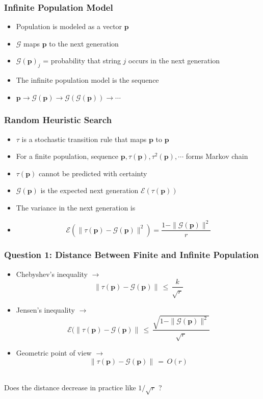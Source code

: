 \documentclass[aspectratio=169]{beamer}
\begin{document}
  \begin{frame}
    \frametitle{Infinite Population Model}
    \begin{itemize}
      \item{Population is modeled as a vector $\bm{p}$}
      \item{$\mathcal{G}$ maps $\bm{p}$ to the next generation}
      \item{$\mathcal{G}(\bm{p})_j$ =  probability that string $j$ occurs in the next generation}
      \item{The infinite population model is the sequence }
      \item{$\bm{p} \to \mathcal{G}(\bm{p}) \to  {\mathcal{G}}(\mathcal{G}(\bm{p})) \to \cdots $}
    \end{itemize}  
  \end{frame}
  
  \begin{frame}
    \frametitle{Random Heuristic Search}
    \begin{itemize}
      \item{$\tau$ is a stochastic transition rule that maps $\bm{p}$ to $\bm{p}$}
      \item{For a finite population, sequence $\bm{p}, \tau(\bm{p}), \tau^2(\bm{p}), \cdots $ forms Markov chain}
      \item{$\tau(\bm{p})$ cannot be predicted with certainty }
      \item{$\mathcal{G}(\bm{p})$ is the expected next generation $\mathcal{E}(\tau(\bm{p}))$}
      \item{The variance in the next generation  is}
      \item{
	\[\mathcal{E}(\| \tau (\bm{p}) - \mathcal{G}(\bm{p}) \|^2) = \frac{1 - \|\mathcal{G}(\bm{p})\|^2}{r}\]
      }
    \end{itemize}
  \end{frame}
  
  \begin{frame}
    \frametitle{Question 1: Distance Between Finite and Infinite Population}
    \begin{itemize}
      \item{Chebyshev's inequality $\to$ \[ \| \tau (\bm{p}) - \mathcal{G}(\bm{p}) \| \,\leq\, \frac{k}{\sqrt{r}} \] }
      \item{Jensen's inequality  
      $\to$ \[ \mathcal{E}(\| \tau (\bm{p}) - \mathcal{G}(\bm{p}) \| \,\leq\, \frac{\sqrt{1 - \|\mathcal{G}(\bm{p})\|^2}}{\sqrt{r}}\]}
      \item{Geometric point of view $\to$ \[ \| \tau (\bm{p}) - \mathcal{G}(\bm{p}) \| \,=\, O(r) \] }      
    \end{itemize}
      \mbox{}\\[0.25 in]
    Does the distance decrease in practice like $1/\sqrt{r}$ ?
  \end{frame}
  
\end{document}
